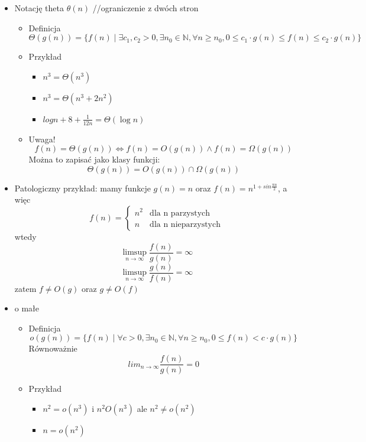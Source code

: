 \documentclass[11pt,a4paper]{article}
\begin{document}
\begin{itemize}
    \item Notację theta $\theta(n)$ //ograniczenie z dwóch stron
        \begin{itemize}
            \item Definicja
                \[
                    \Theta(g(n)) = \{ f(n) \mid \exists c_1, c_2 > 0, \exists n_0 \in \mathbb{N}, \forall n \geq n_0, 0 \leq c_1 \cdot g(n) \leq f(n) \leq c_2 \cdot g(n) \}
                \]
            \item Przykład
                \begin{itemize}
                    \item $n^3 = \Theta(n^3)$
                    \item $n^3 = \Theta(n^3 + 2n^2)$
                    \item $log n +8 + \frac{1}{12n} = \Theta(\log n)$
                \end{itemize}
            \item Uwaga!
                \[
                    f(n) = \Theta(g(n)) \iff f(n) = O(g(n)) \land f(n) = \Omega(g(n))
                \]
                Można to zapisać jako klasy funkcji:
                \[
                    \Theta(g(n)) = O(g(n)) \cap \Omega(g(n))
                \]
        \end{itemize}
    \item Patologiczny przykład:
        mamy funkcje $g(n) = n$ oraz $f(n) = n^{1+sin{\frac{\pi n}{2}}}$, a więc
        \[
            f(n) = \begin{cases}
                n^2 & \text{dla n parzystych} \\
                n & \text{dla n nieparzystych}
            \end{cases}
        \]
        wtedy
        \[
            \limsup_{n \to \infty} \frac{f(n)}{g(n)} = \infty
        \]
        \[
            \limsup_{n \to \infty} \frac{g(n)}{f(n)} = \infty
        \]
        zatem
        $f \neq O(g)$ oraz $g \neq O(f)$
    \item o małe
        \begin{itemize}
            \item Definicja
                \[
                    o(g(n)) = \{ f(n) \mid \forall c > 0, \exists n_0 \in \mathbb{N}, \forall n \geq n_0, 0 \leq f(n) < c \cdot g(n) \}
                \]
                Równoważnie
                \[
                    lim_{n \to \infty} \frac{f(n)}{g(n)} = 0
                \]
            \item Przykład
                \begin{itemize}
                    \item $n^2 = o(n^3)$ i $n^2 O(n^3)$ ale $n^2 \neq o(n^2)$
                    \item $n = o(n^2)$
                \end{itemize}
        \end{itemize}
\end{itemize}
\end{document}

